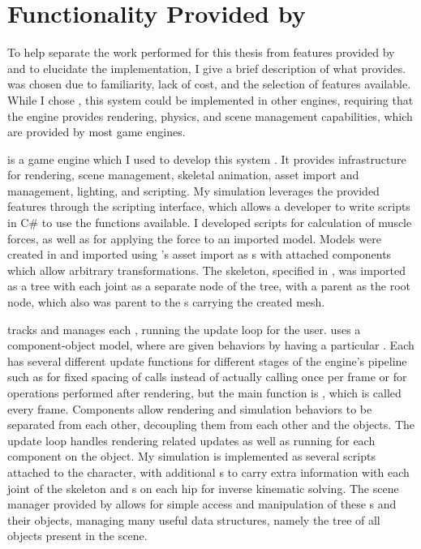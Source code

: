 \section{Functionality Provided by \unity{}}
\label{section:unity}
	To help separate the work performed for this thesis from features provided by \unity{} and to elucidate the implementation, I give a brief description of what \unity{} provides.  \unity{} was chosen due to familiarity, lack of cost, and the selection of features available.  While I chose \unity{}, this system could be implemented in other engines, requiring that the engine provides rendering, physics, and scene management capabilities, which are provided by most game engines.
	
	\unity{} is a game engine which I used to develop this system \cite{unity}.  It provides infrastructure for rendering, scene management, skeletal animation, asset import and management, lighting, and scripting.  My simulation leverages the provided features through the \unity{} scripting interface, which allows a developer to write scripts in C\# to use the functions available.  I developed scripts for calculation of muscle forces, as well as for applying the force to an imported model.  Models were created in \maya{} and imported using \unity{}'s asset import as \unity{} s with attached  components which allow arbitrary transformations.  The skeleton, specified in \maya{}, was imported as a tree with each joint as a separate  node of the tree, with a parent  as the root node, which also was parent to the s carrying the created mesh.
	
	\unity{} tracks and manages each , running the update loop for the user.  \unity{} uses a component-object model, where  are given behaviors by having a particular .  Each  has several different update functions for different stages of the engine's pipeline such as  for fixed spacing of calls instead of actually calling once per frame or  for operations performed after rendering, but the main function is , which is called every frame.  Components allow rendering and simulation behaviors to be separated from each other, decoupling them from each other and the objects.  The update loop handles rendering related updates as well as running  for each component on the object.  My simulation is implemented as several  scripts attached to the character, with additional s to carry extra information with each joint of the skeleton and s on each hip for inverse kinematic solving.  The scene manager provided by \unity{} allows for simple access and manipulation of these s and their objects, managing many useful data structures, namely the tree of all objects present in the scene.
	
